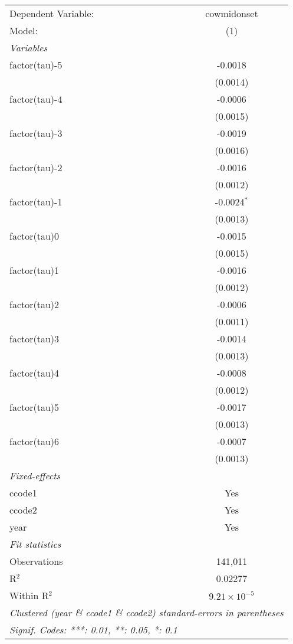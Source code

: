 \begingroup
\centering
\begin{tabular}{lc}
   \tabularnewline \midrule \midrule
   Dependent Variable: & cowmidonset\\  
   Model:              & (1)\\  
   \midrule
   \emph{Variables}\\
   factor(tau)-5       & -0.0018\\   
                       & (0.0014)\\   
   factor(tau)-4       & -0.0006\\   
                       & (0.0015)\\   
   factor(tau)-3       & -0.0019\\   
                       & (0.0016)\\   
   factor(tau)-2       & -0.0016\\   
                       & (0.0012)\\   
   factor(tau)-1       & -0.0024$^{*}$\\   
                       & (0.0013)\\   
   factor(tau)0        & -0.0015\\   
                       & (0.0015)\\   
   factor(tau)1        & -0.0016\\   
                       & (0.0012)\\   
   factor(tau)2        & -0.0006\\   
                       & (0.0011)\\   
   factor(tau)3        & -0.0014\\   
                       & (0.0013)\\   
   factor(tau)4        & -0.0008\\   
                       & (0.0012)\\   
   factor(tau)5        & -0.0017\\   
                       & (0.0013)\\   
   factor(tau)6        & -0.0007\\   
                       & (0.0013)\\   
   \midrule
   \emph{Fixed-effects}\\
   ccode1              & Yes\\  
   ccode2              & Yes\\  
   year                & Yes\\  
   \midrule
   \emph{Fit statistics}\\
   Observations        & 141,011\\  
   R$^2$               & 0.02277\\  
   Within R$^2$        & $9.21\times 10^{-5}$\\   
   \midrule \midrule
   \multicolumn{2}{l}{\emph{Clustered (year \& ccode1 \& ccode2) standard-errors in parentheses}}\\
   \multicolumn{2}{l}{\emph{Signif. Codes: ***: 0.01, **: 0.05, *: 0.1}}\\
\end{tabular}
\par\endgroup



